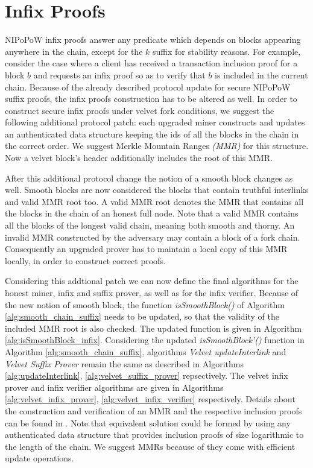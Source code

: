 \section{Infix Proofs}\label{sec:infix}
NIPoPoW infix proofs answer any predicate which depends on blocks appearing anywhere in the chain, except for the $k$ suffix for stability reasons. For example, consider the case where a client has received a transaction inclusion proof for a block $b$ and requests an infix proof so as to verify that $b$ is included in the current chain.
Because of the already described protocol update for secure NIPoPoW suffix proofs, the infix proofs construction has to be altered as well. In order to construct secure infix proofs under velvet fork conditions, we suggest the following additional protocol patch: each upgraded miner constructs and updates an authenticated data structure keeping the ids of all the blocks in the chain in the correct order. We suggest Merkle Mountain Ranges \emph{(MMR)} for this structure. Now a velvet block's header additionally includes the root of this MMR.

After this additional protocol change the notion of a smooth block changes as well. Smooth blocks are now considered the blocks that contain truthful interlinks and valid MMR root too. A valid MMR root denotes the MMR that contains all the blocks in the chain of an honest full node. Note that a valid MMR contains all the blocks of the longest valid chain, meaning both smooth and thorny. An invalid MMR constructed by the adversary may contain a block of a fork chain. Consequently an upgraded prover has to maintain a local copy of this MMR locally, in order to construct correct proofs.%

Considering this addtional patch we can now define the final algorithms for the honest miner, infix and suffix prover, as well as for the infix verifier. Because of the new notion of smooth block, the function \textit{isSmoothBlock()} of Algorithm \ref{alg:smooth_chain_suffix} needs to be updated, so that the validity of the included MMR root is also checked. The updated function is given in Algorithm \ref{alg:isSmoothBlock_infix}. Considering the updated \textit{isSmoothBlock'()} function in Algorithm \ref{alg:smooth_chain_suffix}, algorithms \emph{Velvet updateInterlink} and \emph{Velvet Suffix Prover} remain the same as described in Algorithms \ref{alg:updateInterlink}, \ref{alg:velvet_suffix_prover} repsectively. The velvet infix prover and infix verifier algorithms are given in Algorithms \ref{alg:velvet_infix_prover}, \ref{alg:velvet_infix_verifier} respectively. Details about the construction and verification of an MMR and the respective inclusion proofs can be found in \cite{ct}.
Note that equivalent solution could be formed by using any authenticated data structure that provides inclusion proofs of size logarithmic to the length of the chain. We suggest MMRs because of they come with efficient update operations.

